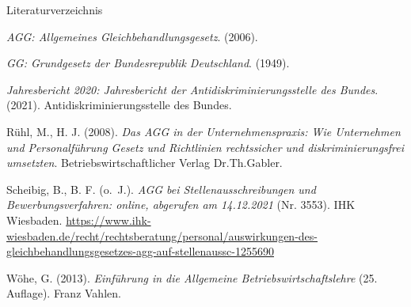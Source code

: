 \documentclass[
  10pt,
  ngerman,
  ignorenonframetext,
]{beamer}
\newlength{\cslhangindent}
\newlength{\cslentryspacingunit} %
\newenvironment{CSLReferences}[2] %
 {%
  \setlength{\parindent}{0pt}
  \ifodd #1
  \let\oldpar\par
  \def\par{\hangindent=\cslhangindent\oldpar}
  \fi
  \setlength{\parskip}{#2\cslentryspacingunit}
 }%
 {}
\begin{document}
\begin{frame}{Literaturverzeichnis}
\hypertarget{refs}{}
\begin{CSLReferences}{1}{0}
\leavevmode{}%
\emph{AGG: Allgemeines Gleichbehandlungsgesetz}. (2006).

\leavevmode{}%
\emph{GG: Grundgesetz der Bundesrepublik Deutschland}. (1949).

\leavevmode{}%
\emph{Jahresbericht 2020: Jahresbericht der Antidiskriminierungsstelle
des Bundes}. (2021). Antidiskriminierungsstelle des Bundes.

\leavevmode{}%
Rühl, M., H. J. (2008). \emph{Das AGG in der Unternehmenspraxis: Wie
Unternehmen und Personalf{ü}hrung Gesetz und Richtlinien rechtssicher
und diskriminierungsfrei umsetzten}. Betriebswirtschaftlicher Verlag
Dr.Th.Gabler.

\leavevmode{}%
Scheibig, B., B. F. (o.~J.). \emph{AGG bei Stellenausschreibungen und
Bewerbungsverfahren: online, abgerufen am 14.12.2021} (Nr. 3553). IHK
Wiesbaden.
\url{https://www.ihk-wiesbaden.de/recht/rechtsberatung/personal/auswirkungen-des-gleichbehandlungsgesetzes-agg-auf-stellenaussc-1255690}

\leavevmode{}%
Wöhe, G. (2013). \emph{Einf{ü}hrung in die Allgemeine
Betriebswirtschaftslehre} (25. Auflage). Franz Vahlen.

\end{CSLReferences}
\end{frame}
\end{document}

